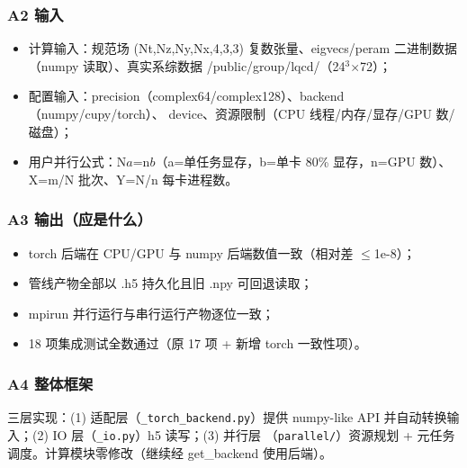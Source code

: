\documentclass[UTF8]{ctexart}
\begin{document}
\subsubsection{A2 输入}
\begin{itemize}
\item 计算输入：规范场 (Nt,Nz,Ny,Nx,4,3,3) 复数张量、eigvecs/peram
二进制数据（numpy 读取）、真实系综数据 /public/group/lqcd/（24$^3$$\times$72）；
\item 配置输入：precision（complex64/complex128）、backend（numpy/cupy/torch）、
device、资源限制（CPU 线程/内存/显存/GPU 数/磁盘）；
\item 用户并行公式：N$a$=n$b$（a=单任务显存，b=单卡 80\% 显存，n=GPU 数）、
X=m/N 批次、Y=N/n 每卡进程数。
\end{itemize}

\subsubsection{A3 输出（应是什么）}
\begin{itemize}
\item torch 后端在 CPU/GPU 与 numpy 后端数值一致（相对差 $\le$1e-8）；
\item 管线产物全部以 .h5 持久化且旧 .npy 可回退读取；
\item mpirun 并行运行与串行运行产物逐位一致；
\item 18 项集成测试全数通过（原 17 项 + 新增 torch 一致性项）。
\end{itemize}

\subsubsection{A4 整体框架}
三层实现：(1) 适配层（\texttt{\nolinkurl{_torch_backend.py}}）提供 numpy-like API
并自动转换输入；(2) IO 层（\texttt{\nolinkurl{_io.py}}）h5 读写；(3) 并行层
（\texttt{\nolinkurl{parallel/}}）资源规划 + 元任务调度。计算模块零修改（继续经
get\_backend 使用后端）。
\end{document}
